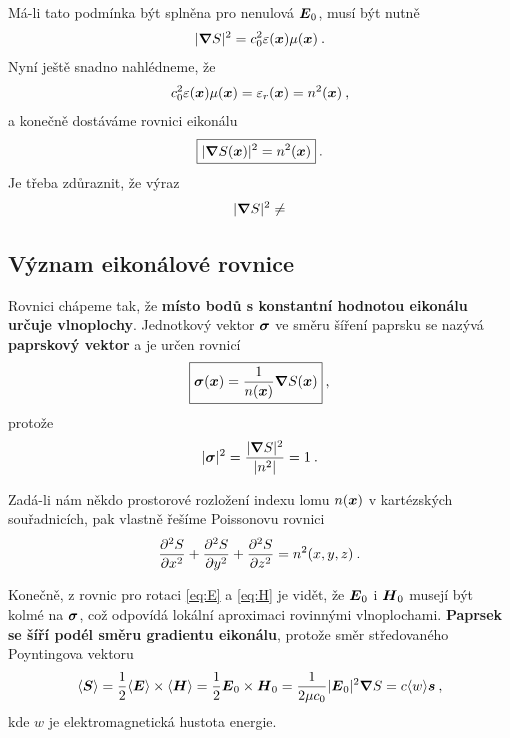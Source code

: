 Má-li tato podmínka být splněna pro nenulová $\boldsymbol{E}_0$, musí být nutně \begin{align}
    |\boldsymbol{\nabla} S|^2 = c_0^2 \varepsilon(\boldsymbol{x}) \mu(\boldsymbol{x}) \:.
\end{align}
Nyní ještě snadno nahlédneme, že \begin{align}
    c_0^2 \varepsilon(\boldsymbol{x}) \mu(\boldsymbol{x}) = \varepsilon_r(\boldsymbol{x})  = n^2(\boldsymbol{x}) \:,
\end{align}
a konečně dostáváme rovnici eikonálu \begin{align}
    \boxed{ |\boldsymbol{\nabla} S (\boldsymbol{x})|^2 = n^2(\boldsymbol{x}) } \:.
\end{align}
Je třeba zdůraznit, že výraz \begin{align}
    |\boldsymbol{\nabla} S|^2 \neq 
\end{align}

\subsection{Význam eikonálové rovnice}

Rovnici chápeme tak, že \textbf{místo bodů s konstantní hodnotou eikonálu určuje vlnoplochy}. Jednotkový vektor $\boldsymbol{\sigma}$ ve směru šíření paprsku se nazývá \textbf{paprskový vektor} a je určen rovnicí \begin{align}
    \boxed{\boldsymbol{\sigma}(\boldsymbol{x}) = \frac{1}{n(\boldsymbol{x})} \boldsymbol{\nabla} S(\boldsymbol{x})} \:,
\end{align}
protože \begin{align}
    |\boldsymbol{\sigma}|^2 = \dfrac{|\boldsymbol{\nabla} S|^2}{|n^2|} = 1 \:.
\end{align}

Zadá-li nám někdo prostorové rozložení indexu lomu $n(\boldsymbol{x})$ v kartézských souřadnicích, pak vlastně řešíme Poissonovu rovnici \begin{align}
    \dfrac{\partial ^2 S}{\partial x^2} + \dfrac{\partial ^2 S}{\partial y^2} + \dfrac{\partial ^2 S}{\partial z^2} = n^2(x,y,z) \:.
\end{align}

Konečně, z rovnic pro rotaci \eqref{eq:E} a \eqref{eq:H} je vidět, že $\boldsymbol{E}_0$ i $\boldsymbol{H}_0$ musejí být kolmé na $\boldsymbol{\sigma}$, což odpovídá lokální aproximaci rovinnými vlnoplochami. \textbf{Paprsek se šíří podél směru gradientu eikonálu}, protože směr středovaného Poyntingova vektoru \begin{align}
    \langle \boldsymbol{S} \rangle = \frac{1}{2} \langle \boldsymbol{E} \rangle \times \langle \boldsymbol{H} \rangle = \frac{1}{2} \boldsymbol{E}_0 \times \boldsymbol{H}_0 = \frac{1}{2 \mu c_0} |\boldsymbol{E}_0|^2 \boldsymbol{\nabla} S = c \langle w \rangle \boldsymbol{s} \:,
\end{align}
kde $w$ je elektromagnetická hustota energie.

